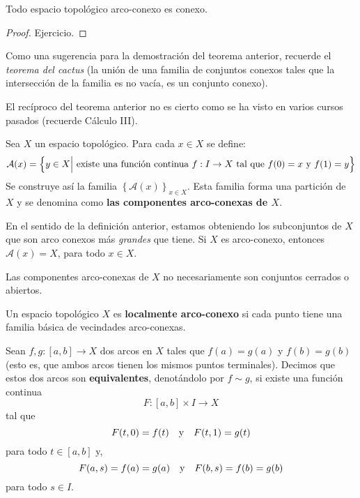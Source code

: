 \documentclass{article}
\theoremstyle{largebreak}
\newcommand\cf[3]{\ensuremath{#1:#2\rightarrow#3}}
\begin{document}
    \begin{theor}
        Todo espacio topológico arco-conexo es conexo.
    \end{theor}

    \begin{proof}
        Ejercicio.
    \end{proof}

    Como una sugerencia para la demostración del teorema anterior, recuerde el \textit{teorema del cactus} (la unión de una familia de conjuntos conexos tales que la intersección de la familia es no vacía, es un conjunto conexo).

    El recíproco del teorema anterior no es cierto como se ha visto en varios cursos pasados (recuerde Cálculo III).

    \begin{mydef}
        Sea $X$ un espacio topológico. Para cada $x\in X$ se define:
        \begin{equation*}
            \mathcal{A}(x)=\left\{y\in X\Big|\textup{ existe una función continua }\cf{f}{I}{X} \textup{ tal que }f(0)=x \textup{ y }f(1)=y \right\}
        \end{equation*}
        Se construye así la familia $\left\{\mathcal{A}(x) \right\}_{ x\in X}$. Esta familia forma una partición de $X$ y se denomina como \textbf{las componentes arco-conexas de $X$}.
    \end{mydef}

    En el sentido de la definición anterior, estamos obteniendo los subconjuntos de $X$ que son arco conexos más \textit{grandes} que tiene. Si $X$ es arco-conexo, entonces $\mathcal{A}(x)=X$, para todo $x\in X$.

    Las componentes arco-conexas de $X$ no necesariamente son conjuntos cerrados o abiertos.

    \begin{mydef}
        Un espacio topológico $X$ es \textbf{localmente arco-conexo} si cada punto tiene una familia básica de vecindades arco-conexas.
    \end{mydef}
    

    \begin{mydef}
        Sean $\cf{f,g}{[a,b]}{X}$ dos arcos en $X$ tales que $f(a)=g(a)$ y $f(b)=g(b)$ (esto es, que ambos arcos tienen los mismos puntos terminales). Decimos que estos dos arcos son \textbf{equivalentes}, denotándolo por $f\sim g$, si existe una función continua
        \begin{equation*}
            \cf{F}{[a,b]\times I}{X}
        \end{equation*}
        tal que
        \begin{equation*}
            F(t,0)=f(t)\quad\textup{y}\quad F(t,1)=g(t)
        \end{equation*}
        para todo $t\in[a,b]$ y,
        \begin{equation*}
            F(a,s)=f(a)=g(a)\quad\textup{y}\quad F(b,s)=f(b)=g(b)
        \end{equation*}
        para todo $s\in I$.
    \end{mydef}
\end{document}
